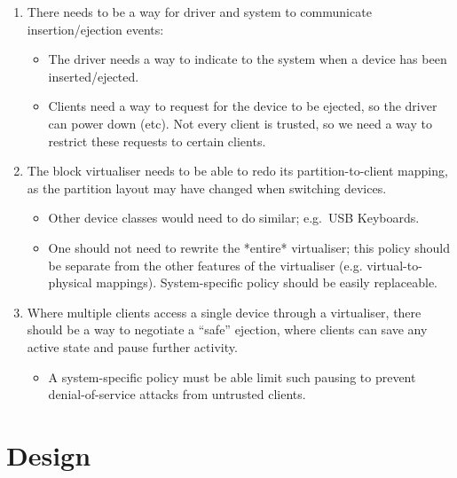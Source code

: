 \documentclass[a4paper,12pt]{report}
\begin{document}
\begin{enumerate}
  \item There needs to be a way for driver and system to communicate
    insertion/ejection events:

        \begin{itemize}
          \item The driver needs a way to indicate to the system when a device has been inserted/ejected.

          \item Clients need a way to request for the device to be ejected, so the
                driver can power down (etc). Not every client is trusted, so we need
                a way to restrict these requests to certain clients.
        \end{itemize}

  \item The block virtualiser needs to be able to redo its partition-to-client
        mapping, as the partition layout may have changed when switching
        devices.

        \begin{itemize}
          \item Other device classes would need to do similar; e.g.~USB Keyboards.
          \item One should not need to rewrite the *entire* virtualiser; this
            policy should be separate from the other features of the virtualiser
            (e.g. virtual-to-physical mappings). System-specific policy should
            be easily replaceable.
        \end{itemize}

  \item Where multiple clients access a single device through a virtualiser,
        there should be a way to negotiate a ``safe'' ejection, where clients
        can save any active state and pause further activity.

        \begin{itemize}
          \item A system-specific policy must be able limit such
            pausing to prevent denial-of-service attacks from untrusted
            clients.
        \end{itemize}
\end{enumerate}

\section{Design}\label{s:hp-design}
\end{document}
